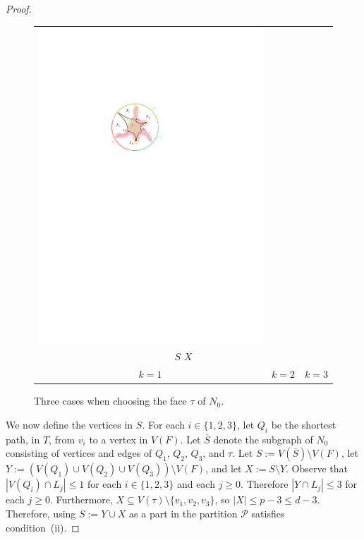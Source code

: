 \documentclass{patmorin}
\theoremstyle{plain}
\theoremstyle{definition}
\newcommand{\PP}{\mathcal{P}}
\renewcommand{\ge}{\geqslant}
\renewcommand{\le}{\leqslant}
\begin{document}
\begin{proof}
\begin{figure}[!b]
\begin{center}
\begin{tabular}{c@{}c@{}c}
        \includegraphics{figs/zoomba-3} \\
        \multicolumn{3}{c}{{\color{brew8}\raisebox{-3pt}{\rule{12pt}{12pt}}} $S$\qquad {\color{brew2}\raisebox{-3pt}{\rule{12pt}{12pt}}} $X$} \\
        $k=1$ & $k=2$ & $k=3$
      \end{tabular}
    \end{center}
    \caption{Three cases when choosing the face $\tau$ of $N_0$.}
    \label{boring_figure}
  \end{figure}

  We now define the vertices in $S$.  For each $i\in\{1,2,3\}$, let $Q_i$ be the shortest path, in $T$, from $v_i$ to a vertex in $V(F)$.  Let $\overline{S}$ denote the subgraph of $N_0$ consisting of vertices and edges of $Q_1$, $Q_2$, $Q_3$, and $\tau$. Let $S:=V(\overline{S})\setminus V(F)$, let $Y:=(V(Q_1)\cup V(Q_2)\cup V(Q_3))\setminus V(F)$, and let $X:=S\setminus Y$. Observe that $|V(Q_i)\cap L_j|\le 1$   for each $i\in\{1,2,3\}$ and each $j\ge 0$.  Therefore $|Y\cap L_j|\le 3$ for each $j\ge 0$. Furthermore, $X\subseteq V(\tau)\setminus\{v_1,v_2,v_3\}$, so $|X|\le p-3\le d-3$. Therefore, using $S:=Y\cup X$ as a part in the partition $\PP$ satisfies condition~(ii).


\end{proof}
\end{document}
